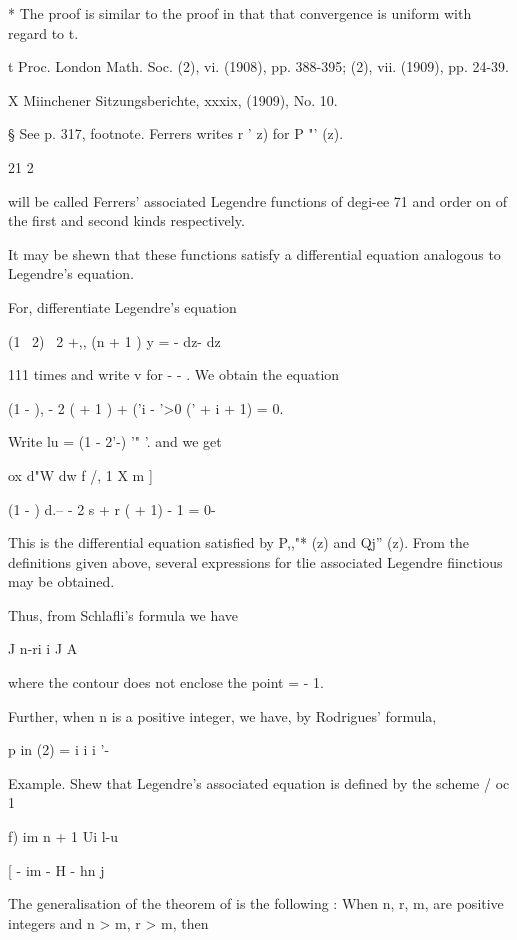{{{* The proof is similar to the proof in that that convergence is
uniform with regard to t.

t Proc. London Math. Soc. (2), vi. (1908), pp. 388-395; (2), vii.
(1909), pp. 24-39.

X Miinchener Sitzungsberichte, xxxix, (1909), No. 10.

§ See p. 317, footnote. Ferrers writes r ' z) for P "' (z).

21 2

%
%

will be called Ferrers' associated Legendre functions of degi-ee 71
and order on of the first and second kinds respectively.

It may be shewn that these functions satisfy a differential equation
analogous to Legendre's equation.

For, differentiate Legendre's equation

(1 \ 2) \ 2 +,, (n + 1 ) y = - dz- dz

111 times and write v for - - . We obtain the equation

(1 - ), - 2 ( + 1 ) + ('i - '>0 (' + i + 1) = 0.

Write lu = (1 - 2'-) '" '. and we get

ox d"W dw f /, 1 X m ]

(1 - ) d.-- - 2 s + r ( + 1) - 1 = 0-

This is the differential equation satisfied by P,,"* (z) and Qj'' (z).
From the definitions given above, several expressions for tlie
associated Legendre fiinctious may be obtained.

Thus, from Schlafli's formula we have

J n-ri i J A

where the contour does not enclose the point = - 1.

Further, when n is a positive integer, we have, by Rodrigues' formula,

p in (2) = i i i '-

Example. Shew that Legendre's associated equation is defined by the
scheme / oc 1

f) im n + 1 Ui l-u 

[ - im - H - hn j

The generalisation of the theorem of is the following : When
n, r, m, are positive integers and n > m, r > m, then

}}}
